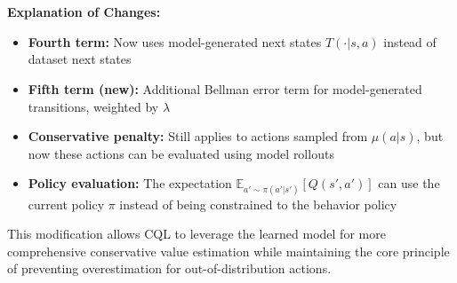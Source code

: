 \documentclass[12pt]{article}
\begin{document}
{{\begin{enumerate}
    \textbf{Explanation of Changes:}
    \begin{itemize}
        \item \textbf{Fourth term:} Now uses model-generated next states $\hat{T}(\cdot|s,a)$ instead of dataset next states
        \item \textbf{Fifth term (new):} Additional Bellman error term for model-generated transitions, weighted by $\lambda$
        \item \textbf{Conservative penalty:} Still applies to actions sampled from $\mu(a|s)$, but now these actions can be evaluated using model rollouts
        \item \textbf{Policy evaluation:} The expectation $\mathbb{E}_{a' \sim \pi(a'|s')}[Q(s',a')]$ can use the current policy $\pi$ instead of being constrained to the behavior policy
    \end{itemize}
    
    This modification allows CQL to leverage the learned model for more comprehensive conservative value estimation while maintaining the core principle of preventing overestimation for out-of-distribution actions.
\end{enumerate}


}}


\newpage
\end{document}

